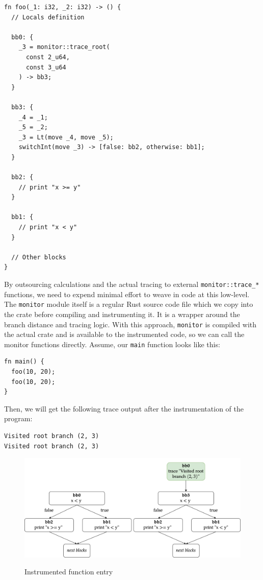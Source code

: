 \documentclass[paper=a4,%
  twoside,%
  BCOR4mm,%
  abstract=true,%
  toc=bibliography,%
  chapterprefix=true,%
  toc=bibliographynumbered,%
  open=right,%
  english,%
  pagesize=pdftex]{scrreprt}
\begin{document}
\begin{lstlisting}[style=boxed, caption={}, label=lst:mir-instrument-root]
fn foo(_1: i32, _2: i32) -> () {
  // Locals definition

  bb0: {
    _3 = monitor::trace_root(
      const 2_u64, 
      const 3_u64
    ) -> bb3;
  }

  bb3: {
    _4 = _1;
    _5 = _2;
    _3 = Lt(move _4, move _5);
    switchInt(move _3) -> [false: bb2, otherwise: bb1];
  }

  bb2: {
    // print "x >= y"
  }

  bb1: {
    // print "x < y"
  }

  // Other blocks
}
\end{lstlisting}

By outsourcing calculations and the actual tracing to external \texttt{monitor::trace\string_*} functions, we need to expend minimal effort to weave in code at this low-level. The \texttt{monitor} module itself is a regular Rust source code file which we copy into the crate before compiling and instrumenting it. It is a wrapper around the branch distance and tracing logic. With this approach, \texttt{monitor} is compiled with the actual crate and is available to the instrumented code, so we can call the monitor functions directly. Assume, our \texttt{main} function looks like this:
\begin{lstlisting}[style=boxed, caption={}]
fn main() {
  foo(10, 20);
  foo(10, 20);
}
\end{lstlisting}

Then, we will get the following trace output after the instrumentation of the program:

\begin{lstlisting}[language={}, style=boxed, caption={}]
Visited root branch (2, 3)
Visited root branch (2, 3)
\end{lstlisting}

\begin{figure}[h]
\caption{Instrumented function entry}
\centering
\includegraphics[width=\textwidth]{comparison-instrumented-fn-entry}
\label{fig:comparison-instrumented-fn-entry}
\end{figure}
\end{document}
